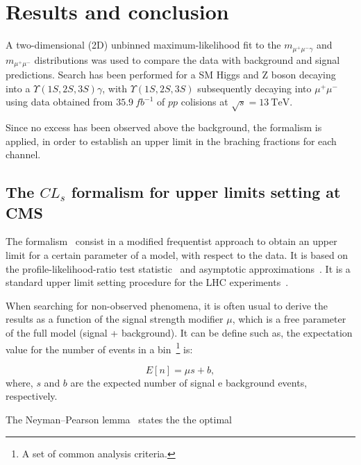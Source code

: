 \chapter{Results and conclusion}
\label{chaper_results}

A two-dimensional (2D) unbinned maximum-likelihood fit to the $m_{\mu^{+}\mu^{-}\gamma}$ and $m_{\mu^{+}\mu^{-}}$ distributions was used to compare the data with background and signal predictions. Search has been performed for a SM Higgs and $\mathrm{Z}$ boson decaying into a $\Upsilon(1S,2S,3S)\gamma$, with $\Upsilon(1S,2S,3S)$ subsequently decaying into $\mu^{+}\mu^{-}$ using data obtained from $35.9~fb^{-1}$ of $pp$ colisions at $\sqrt{s}=13~\mathrm{TeV}$. 

Since no excess has been observed above the background, the \CLs formalism is applied, in order to establish an upper limit in the braching fractions for each channel.

\section{The $CL_{s}$ formalism for upper limits setting at CMS}
\label{sec:cls}

The \CLs formalism~\cite{cls_Read_2002} consist in a modified frequentist approach to obtain an upper limit for a certain parameter of a model, with respect to the data. It is based on the profile-likelihood-ratio test statistic~\cite{profiled_lh} and asymptotic approximations~\cite{asymptotic_cls}. It is a standard upper limit setting procedure for the LHC experiments~\cite{CMS-NOTE-2011-005}.

When searching for non-observed phenomena, it is often usual to derive the results as a function of the signal strength modifier $\mu$, which is a free parameter of the full model (signal + background). It can be define such as, the expectation value for the number of events in a bin~\footnote{A set of common analysis criteria.} is:


\begin{equation}
\label{eqn:signal_strength}
E[n] = \mu s + b,
\end{equation}
where, $s$ and $b$ are the expected number of signal e background events, respectively.

The Neyman–Pearson lemma~\cite{profiled_lh} states the the optimal 



